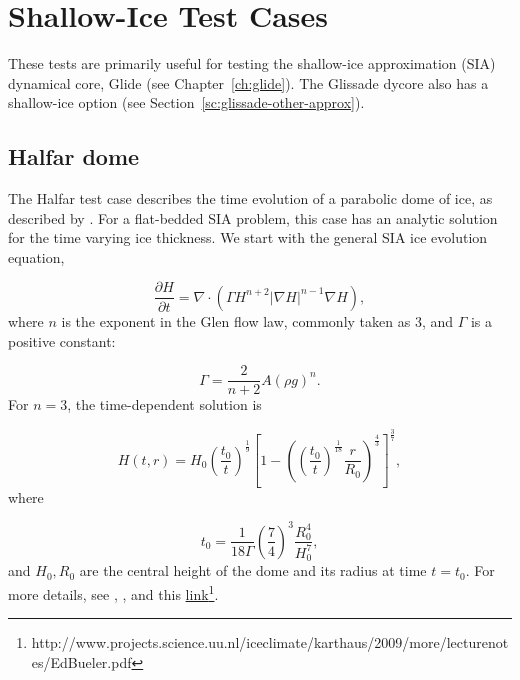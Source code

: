 
\section{Shallow-Ice Test Cases}
\label{sc:sia-tests}

These tests are primarily useful for testing the shallow-ice approximation (SIA) dynamical core, Glide (see Chapter~\ref{ch:glide}).
The Glissade dycore also has a shallow-ice option (see Section~\ref{sc:glissade-other-approx}).

\subsection{Halfar dome}

\label{sec:halfar_description}
The Halfar test case describes the time evolution of a parabolic dome of ice, as described by \citet{Halfar1983}.
For a flat-bedded SIA problem, this case has an analytic solution for the time varying ice thickness. We start with the
general SIA ice evolution equation,  

\begin{equation}
    \label{halfar}
    \frac{\partial H}{\partial t} = \nabla \cdot (\Gamma H^{n+2} |\nabla H|^{n-1} \nabla H),
\end{equation}
%
where $n$ is the exponent in the Glen flow law, commonly taken as 3, and $\Gamma$ is a positive constant:

\begin{equation}
    \Gamma = \frac{2}{n+2} A (\rho g)^n.
\end{equation}
%
For $n=3$, the time-dependent solution is

\begin{equation}
    H(t,r) = H_0 \left(\frac{t_0}{t}\right)^\frac{1}{9}  \left[ 1 - \left(  \left( \frac{t_0}{t} \right) ^ \frac{1}{18} \frac{r}{R_0} \right)^\frac{4}{3} \right] ^ \frac{3}{7},
\end{equation}
%
where

\begin{equation}
    t_0 = \frac{1}{18\Gamma} \left( \frac{7}{4} \right)^3 \frac{R_0^4}{H_0^7},
\end{equation}
%
and $H_0, R_0$ are the central height of the dome and its radius at time $t=t_0$.
For more details, see \citet{Halfar1983}, \citet{Bueler2005}, and this \href{http://www.projects.science.uu.nl/iceclimate/karthaus/2009/more/lecturenotes/EdBueler.pdf}{link}\footnote{http://www.projects.science.uu.nl/iceclimate/karthaus/2009/more/lecturenotes/EdBueler.pdf}.

